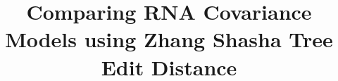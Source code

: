 \documentclass[10pt,conference,peerreview]{IEEEtran}
\begin{document}
\title{Comparing RNA Covariance Models using Zhang Shasha Tree Edit Distance}



\author{
 \\
\and
{}
\and \\
}



\maketitle






\newcommand{\mra}{Multiple Read Alignment}
\newcommand{\mraabv}{MRA}
\newcommand{\smm}{Stochastic Markov Model}
\newcommand{\smmabv}{SMM}
\newcommand{\srg}{Stochastic Regular Grammar}
\newcommand{\srgabv}{SRG}
\newcommand{\sss}{Secondary Structures}
\newcommand{\sssabv}{SS}
\newcommand{\cm}{Covariance Model}
\newcommand{\cmabv}{CM}
\newcommand{\scfg}{Stochastic Context Free Grammar}
\newcommand{\scfgabv}{SCFG}
\newcommand{\rnaf}{RNA families}
\newcommand{\ged}{Grammatical Edit Distance}
\newcommand{\gedabv}{GED}
\newcommand{\svpa}{Stochastic Visibly Pushdown Automaton}
\newcommand{\svpaabv}{SVPA}
\newcommand{\lo}{log-odds}
\newcommand{\clique}{clan}



















\printbibliography
\end{document}
